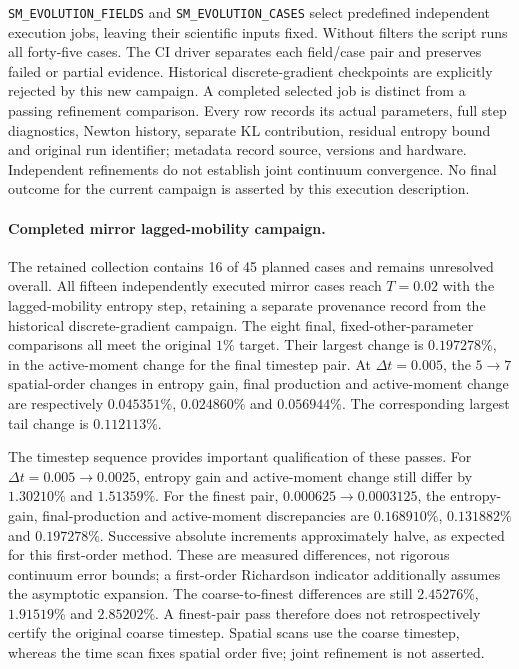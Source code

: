 \documentclass[11pt,letterpaper]{article}
\begin{document}
\texttt{SM\_EVOLUTION\_FIELDS} and \texttt{SM\_EVOLUTION\_CASES} select
predefined independent execution jobs, leaving their scientific inputs fixed.
Without filters the script runs all forty-five cases. The CI driver
separates each field/case pair and preserves failed or partial evidence.
Historical discrete-gradient checkpoints are explicitly rejected by this
new campaign. A completed selected job is distinct from a passing refinement
comparison. Every row records its actual parameters, full step diagnostics,
Newton history, separate KL contribution, residual entropy bound and original
run identifier; metadata record source, versions and hardware. Independent
refinements do not establish joint continuum convergence. No final outcome
for the current campaign is asserted by this execution description.

\paragraph{Completed mirror lagged-mobility campaign.}
The retained collection contains 16 of 45 planned cases and remains
unresolved overall. All fifteen independently executed mirror cases reach $T=0.02$ with the
lagged-mobility entropy step, retaining a separate provenance record from
the historical discrete-gradient campaign. The eight final, fixed-other-parameter
comparisons all meet the original $1\%$ target. Their largest change is
$0.197278\%$, in the active-moment change for the final timestep pair.
At $\Delta t=0.005$, the $5\to7$ spatial-order changes in entropy gain,
final production and active-moment change are respectively
$0.045351\%$, $0.024860\%$ and $0.056944\%$.
The corresponding largest tail change is $0.112113\%$.

The timestep sequence provides important qualification of these passes.
For $\Delta t=0.005\to0.0025$, entropy gain and active-moment change
still differ by $1.30210\%$ and $1.51359\%$. For the finest pair,
$0.000625\to0.0003125$, the entropy-gain, final-production and
active-moment discrepancies are $0.168910\%$, $0.131882\%$ and
$0.197278\%$. Successive absolute increments approximately halve,
as expected for this first-order method. These are measured differences,
not rigorous continuum error bounds; a first-order Richardson indicator
additionally assumes the asymptotic expansion. The coarse-to-finest differences
are still $2.45276\%$, $1.91519\%$ and $2.85202\%$.
A finest-pair pass therefore does not retrospectively certify the original
coarse timestep. Spatial scans use the coarse timestep, whereas the time
scan fixes spatial order five; joint refinement is not asserted.
\end{document}
